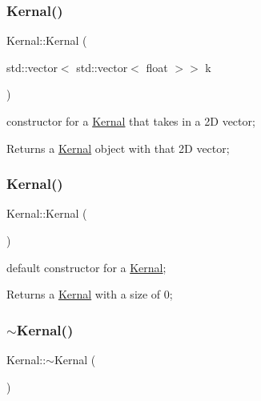 \subsubsection{\texorpdfstring{Kernal()}{Kernal()}\hspace{0.1cm}{\footnotesize\ttfamily [1/2]}}
{\footnotesize\ttfamily Kernal\+::\+Kernal (\begin{DoxyParamCaption}\item[{std\+::vector$<$ std\+::vector$<$ float $>$$>$}]{k }\end{DoxyParamCaption})}



constructor for a \hyperlink{classKernal}{Kernal} that takes in a 2D vector; 

\begin{DoxyReturn}{Returns}
a \hyperlink{classKernal}{Kernal} object with that 2D vector; 
\end{DoxyReturn}
\mbox{\label{classKernal_a6b9b76d7863d4984485ed34cb492f12c}} 
\subsubsection{\texorpdfstring{Kernal()}{Kernal()}\hspace{0.1cm}{\footnotesize\ttfamily [2/2]}}
{\footnotesize\ttfamily Kernal\+::\+Kernal (\begin{DoxyParamCaption}{ }\end{DoxyParamCaption})}



default constructor for a \hyperlink{classKernal}{Kernal}; 

\begin{DoxyReturn}{Returns}
a \hyperlink{classKernal}{Kernal} with a size of 0; 
\end{DoxyReturn}
\mbox{\label{classKernal_aab6e0d2f014ad2f828bbbd8236cdeedc}} 
\subsubsection{\texorpdfstring{$\sim$\+Kernal()}{~Kernal()}}
{\footnotesize\ttfamily Kernal\+::$\sim$\+Kernal (\begin{DoxyParamCaption}{ }\end{DoxyParamCaption})}



